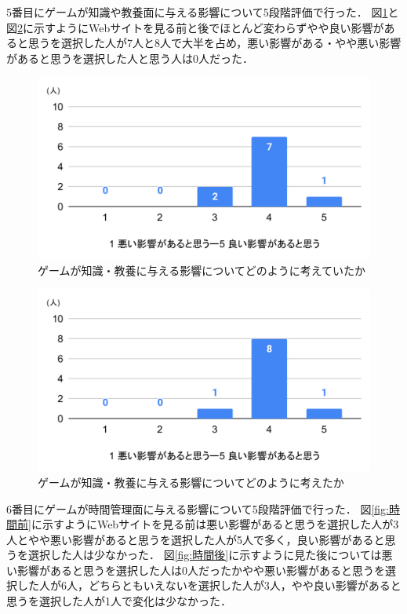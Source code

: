 \documentclass[12pt,a4j,titlepage]{ltjsarticle}
\begin{document}
5番目にゲームが知識や教養面に与える影響について5段階評価で行った．
図\ref{fig:知識前}と図\ref{fig:知識後}に示すようにWebサイトを見る前と後でほとんど変わらずやや良い影響があると思うを選択した人が7人と8人で大半を占め，悪い影響がある・やや悪い影響があると思うを選択した人と思う人は0人だった．

\begin{figure}[H]
 \begin{center}
  \includegraphics[keepaspectratio, scale=0.6]{PDF/知識前.pdf}
 \end{center}
 \caption{ゲームが知識・教養に与える影響についてどのように考えていたか}
 \label{fig:知識前}
\end{figure}

\begin{figure}[H]
 \begin{center}
  \includegraphics[keepaspectratio, scale=0.6]{PDF/知識後.pdf}
 \end{center}
 \caption{ゲームが知識・教養に与える影響についてどのように考えたか}
 \label{fig:知識後}
\end{figure}

6番目にゲームが時間管理面に与える影響について5段階評価で行った．
図\ref{fig:時間前}に示すようにWebサイトを見る前は悪い影響があると思うを選択した人が3人とやや悪い影響があると思うを選択した人が5人で多く，良い影響があると思うを選択した人は少なかった．
図\ref{fig:時間後}に示すように見た後については悪い影響があると思うを選択した人は0人だったかやや悪い影響があると思うを選択した人が6人，どちらともいえないを選択した人が3人，やや良い影響があると思うを選択した人が1人で変化は少なかった．
\end{document}
